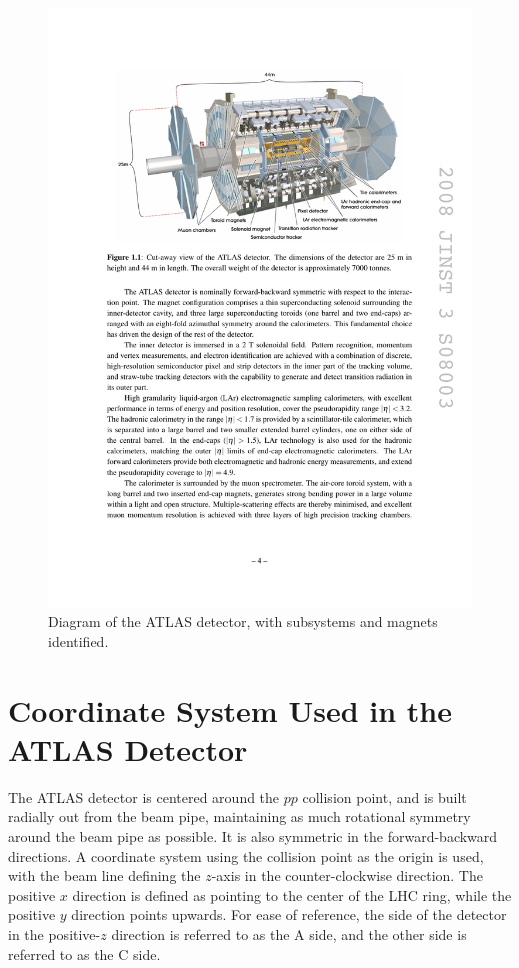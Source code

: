 \begin{centering}
\begin{figure}[bth]
\myfloatalign
\includegraphics[width=.90\linewidth]{figures/atlas/detector.pdf}
\caption{Diagram of the \ac{ATLAS} detector, with subsystems and magnets identified.}
\label{fig:detector}
\end{figure}
\end{centering}

\section{Coordinate System Used in the \ac{ATLAS} Detector}
\label{sec:coords}

The \ac{ATLAS} detector is centered around the $pp$ collision point, and is built radially out from the beam pipe, maintaining as much rotational symmetry around the beam pipe as possible. It is also symmetric in the forward-backward directions. A coordinate system using the collision point as the origin is used, with the beam line defining the $z$-axis in the counter-clockwise direction. The positive $x$ direction is defined as pointing to the center of the \ac{LHC} ring, while the positive $y$ direction points upwards. For ease of reference, the side of the detector in the positive-$z$ direction is referred to as the A side, and the other side is referred to as the C side. 

